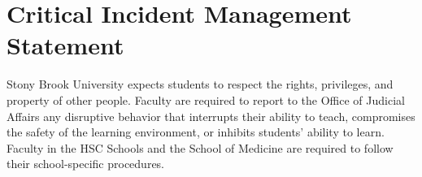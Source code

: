 \documentclass[11pt]{amsart}
\numberwithin{equation}{section}
\begin{document}
\section{Critical Incident Management Statement}
Stony Brook University expects students to respect the rights, privileges, and property of other people. Faculty are required to report to the Office of Judicial Affairs any disruptive behavior that interrupts their ability to teach, compromises the safety of the learning environment, or inhibits students' ability to learn. Faculty in the HSC Schools and the School of Medicine are required to follow their school-specific procedures.
\end{document}

